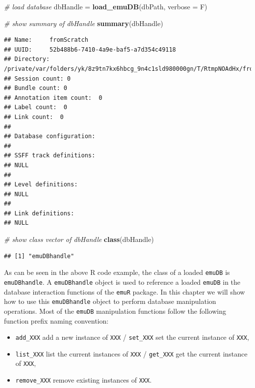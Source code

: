 \documentclass[]{book}
\newenvironment{Shaded}{\begin{snugshade}}{\end{snugshade}}
\newcommand{\CommentTok}[1]{\textcolor[rgb]{0.56,0.35,0.01}{\textit{#1}}}
\newcommand{\DataTypeTok}[1]{\textcolor[rgb]{0.13,0.29,0.53}{#1}}
\newcommand{\KeywordTok}[1]{\textcolor[rgb]{0.13,0.29,0.53}{\textbf{#1}}}
\newcommand{\NormalTok}[1]{#1}
\newcommand{\StringTok}[1]{\textcolor[rgb]{0.31,0.60,0.02}{#1}}
\providecommand{\tightlist}{%
  \setlength{\itemsep}{0pt}\setlength{\parskip}{0pt}}
\begin{document}
\begin{Shaded}
\begin{Highlighting}[]
\CommentTok{# load database}
\NormalTok{dbHandle =}\StringTok{ }\KeywordTok{load_emuDB}\NormalTok{(dbPath, }\DataTypeTok{verbose =}\NormalTok{ F)}

\CommentTok{# show summary of dbHandle}
\KeywordTok{summary}\NormalTok{(dbHandle)}
\end{Highlighting}
\end{Shaded}

\begin{verbatim}
## Name:     fromScratch 
## UUID:     52b488b6-7410-4a9e-baf5-a7d354c49118 
## Directory:    /private/var/folders/yk/8z9tn7kx6hbcg_9n4c1sld980000gn/T/RtmpNOAdHx/fromScratch_emuDB 
## Session count: 0 
## Bundle count: 0 
## Annotation item count:  0 
## Label count:  0 
## Link count:  0 
## 
## Database configuration:
## 
## SSFF track definitions:
## NULL
## 
## Level definitions:
## NULL
## 
## Link definitions:
## NULL
\end{verbatim}

\begin{Shaded}
\begin{Highlighting}[]
\CommentTok{# show class vector of dbHandle}
\KeywordTok{class}\NormalTok{(dbHandle)}
\end{Highlighting}
\end{Shaded}

\begin{verbatim}
## [1] "emuDBhandle"
\end{verbatim}

As can be seen in the above R code example, the class of a loaded \texttt{emuDB} is \texttt{emuDBhandle}. A \texttt{emuDBhandle} object is used to reference a loaded \texttt{emuDB} in the database interaction functions of the \texttt{emuR} package. In this chapter we will show how to use this \texttt{emuDBhandle} object to perform database manipulation operations. Most of the \texttt{emuDB} manipulation functions follow the following function prefix naming convention:

\begin{itemize}
\tightlist
\item
  \texttt{add\_XXX} add a new instance of \texttt{XXX} / \texttt{set\_XXX} set the current instance of \texttt{XXX},
\item
  \texttt{list\_XXX} list the current instances of \texttt{XXX} / \texttt{get\_XXX} get the current instance of \texttt{XXX},
\item
  \texttt{remove\_XXX} remove existing instances of \texttt{XXX}.
\end{itemize}
\end{document}
